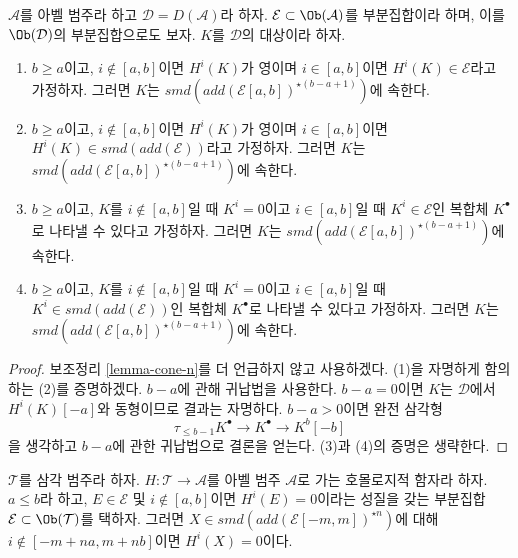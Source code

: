 \begin{lemma}
\label{lemma-in-cone-n}
$\mathcal{A}$를 아벨 범주라 하고 $\mathcal{D} = D(\mathcal{A})$라 하자.
$\mathcal{E} \subset \Ob(\mathcal{A})$를 부분집합이라 하며, 이를
$\Ob(\mathcal{D})$의 부분집합으로도 보자. $K$를 $\mathcal{D}$의
대상이라 하자.
\begin{enumerate}
\item $b \geq a$이고, $i \not \in [a, b]$이면 $H^i(K)$가 영이며
$i \in [a, b]$이면 $H^i(K) \in \mathcal{E}$라고 가정하자. 그러면
$K$는 $smd(add(\mathcal{E}[a, b])^{\star (b - a + 1)})$에 속한다.
\item $b \geq a$이고, $i \not \in [a, b]$이면 $H^i(K)$가 영이며
$i \in [a, b]$이면 $H^i(K) \in smd(add(\mathcal{E}))$라고 가정하자.
그러면 $K$는 $smd(add(\mathcal{E}[a, b])^{\star (b - a + 1)})$에 속한다.
\item $b \geq a$이고, $K$를 $i \not \in [a, b]$일 때 $K^i = 0$이고
$i \in [a, b]$일 때 $K^i \in \mathcal{E}$인 복합체 $K^\bullet$로
나타낼 수 있다고 가정하자. 그러면 $K$는
$smd(add(\mathcal{E}[a, b])^{\star (b - a + 1)})$에 속한다.
\item $b \geq a$이고, $K$를 $i \not \in [a, b]$일 때 $K^i = 0$이고
$i \in [a, b]$일 때 $K^i \in smd(add(\mathcal{E}))$인 복합체
$K^\bullet$로 나타낼 수 있다고 가정하자. 그러면 $K$는
$smd(add(\mathcal{E}[a, b])^{\star (b - a + 1)})$에 속한다.
\end{enumerate}
\end{lemma}

\begin{proof}
보조정리 \ref{lemma-cone-n}를 더 언급하지 않고 사용하겠다.
(1)을 자명하게 함의하는 (2)를 증명하겠다. $b - a$에 관해 귀납법을
사용한다.
$b - a = 0$이면 $K$는 $\mathcal{D}$에서 $H^i(K)[-a]$와 동형이므로
결과는 자명하다. $b - a > 0$이면 완전 삼각형
$$
\tau_{\leq b - 1}K^\bullet \to K^\bullet \to K^b[-b]
$$
을 생각하고 $b - a$에 관한 귀납법으로 결론을 얻는다.
(3)과 (4)의 증명은 생략한다.
\end{proof}

\begin{lemma}
\label{lemma-forward-cone-n}
$\mathcal{T}$를 삼각 범주라 하자. $H : \mathcal{T} \to \mathcal{A}$를
아벨 범주 $\mathcal{A}$로 가는 호몰로지적 함자라 하자.
$a \leq b$라 하고, $E \in \mathcal{E}$ 및 $i \not \in [a, b]$이면
$H^i(E) = 0$이라는 성질을 갖는 부분집합
$\mathcal{E} \subset \Ob(\mathcal{T})$를 택하자. 그러면
$X \in smd(add(\mathcal{E}[-m, m])^{\star n})$에 대해
$i \not \in [-m + na, m + nb]$이면 $H^i(X) = 0$이다.
\end{lemma}

